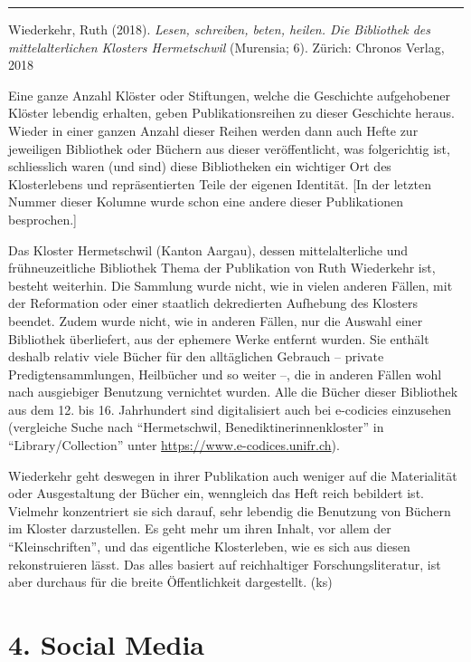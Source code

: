 \documentclass[a4paper,
fontsize=11pt,
oneside,
numbers=noperiodatend,
parskip=half-,
bibliography=totoc,
final
]{scrartcl}
\begin{document}
\begin{center}\rule{0.5\linewidth}{0.5pt}\end{center}

Wiederkehr, Ruth (2018). \emph{Lesen, schreiben, beten, heilen. Die
Bibliothek des mittelalterlichen Klosters Hermetschwil} (Murensia; 6).
Zürich: Chronos Verlag, 2018

Eine ganze Anzahl Klöster oder Stiftungen, welche die Geschichte
aufgehobener Klöster lebendig erhalten, geben Publikationsreihen zu
dieser Geschichte heraus. Wieder in einer ganzen Anzahl dieser Reihen
werden dann auch Hefte zur jeweiligen Bibliothek oder Büchern aus dieser
veröffentlicht, was folgerichtig ist, schliesslich waren (und sind)
diese Bibliotheken ein wichtiger Ort des Klosterlebens und
repräsentierten Teile der eigenen Identität. {[}In der letzten Nummer
dieser Kolumne wurde schon eine andere dieser Publikationen
besprochen.{]}

Das Kloster Hermetschwil (Kanton Aargau), dessen mittelalterliche und
frühneuzeitliche Bibliothek Thema der Publikation von Ruth Wiederkehr
ist, besteht weiterhin. Die Sammlung wurde nicht, wie in vielen anderen
Fällen, mit der Reformation oder einer staatlich dekredierten Aufhebung
des Klosters beendet. Zudem wurde nicht, wie in anderen Fällen, nur die
Auswahl einer Bibliothek überliefert, aus der ephemere Werke entfernt
wurden. Sie enthält deshalb relativ viele Bücher für den alltäglichen
Gebrauch -- private Predigtensammlungen, Heilbücher und so weiter --,
die in anderen Fällen wohl nach ausgiebiger Benutzung vernichtet wurden.
Alle die Bücher dieser Bibliothek aus dem 12. bis 16. Jahrhundert sind
digitalisiert auch bei e-codicies einzusehen (vergleiche Suche nach
\enquote{Hermetschwil, Benediktinerinnenkloster} in
\enquote{Library/Collection} unter
\url{https://www.e-codices.unifr.ch}).

Wiederkehr geht deswegen in ihrer Publikation auch weniger auf die
Materialität oder Ausgestaltung der Bücher ein, wenngleich das Heft
reich bebildert ist. Vielmehr konzentriert sie sich darauf, sehr
lebendig die Benutzung von Büchern im Kloster darzustellen. Es geht mehr
um ihren Inhalt, vor allem der \enquote{Kleinschriften}, und das
eigentliche Klosterleben, wie es sich aus diesen rekonstruieren lässt.
Das alles basiert auf reichhaltiger Forschungsliteratur, ist aber
durchaus für die breite Öffentlichkeit dargestellt. (ks)

\hypertarget{social-media}{%
\section{4. Social Media}\label{social-media}}
\end{document}
